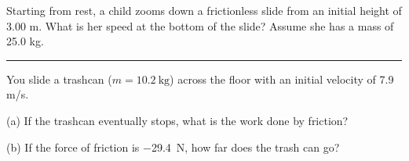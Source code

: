 \documentclass[12pt]{exam}
\begin{document}
\begin{questions}

\Large


\question 
  Starting from rest, a child zooms down a frictionless slide from an initial height of 3.00 m.  What is her speed at the bottom of the slide?  Assume she has a mass of 25.0 kg.

  \vs \hrule \vs

\question
  You slide a trashcan ($m = \SI{10.2}{\kilo\gram}$) across the floor with an initial velocity of 7.9 m/s.
  
  \vspace{1em}
  
      (a) If the trashcan eventually stops, what is the work done by friction?
      
      (b) If the force of friction is \SI{-29.4}{\newton}, how far does the trash can go?
  \vs

\end{questions}
\end{document}
